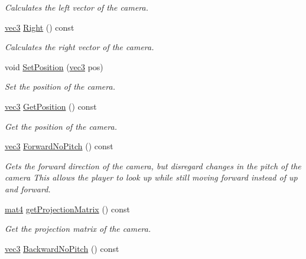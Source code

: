 \begin{DoxyCompactItemize}
\begin{DoxyCompactList}\small\item\em Calculates the left vector of the camera. \end{DoxyCompactList}\item 
\hyperlink{_types_8h_a3d0ce73e3199de81565fb01632415288}{vec3} \hyperlink{class_m_camera_a797ea9942318253479e27984da3ab285}{Right} () const 
\begin{DoxyCompactList}\small\item\em Calculates the right vector of the camera. \end{DoxyCompactList}\item 
void \hyperlink{class_m_camera_a17c2c4147555b6aaba51dec8d57e024b}{Set\+Position} (\hyperlink{_types_8h_a3d0ce73e3199de81565fb01632415288}{vec3} pos)
\begin{DoxyCompactList}\small\item\em Set the position of the camera. \end{DoxyCompactList}\item 
\hyperlink{_types_8h_a3d0ce73e3199de81565fb01632415288}{vec3} \hyperlink{class_m_camera_ac553d9ca4e16e421fe2ce9366c1f237e}{Get\+Position} () const 
\begin{DoxyCompactList}\small\item\em Get the position of the camera. \end{DoxyCompactList}\item 
\hyperlink{_types_8h_a3d0ce73e3199de81565fb01632415288}{vec3} \hyperlink{class_m_camera_a7c3c46db993bd13e119362483d93abc4}{Forward\+No\+Pitch} () const 
\begin{DoxyCompactList}\small\item\em Gets the forward direction of the camera, but disregard changes in the pitch of the camera This allows the player to look up while still moving forward instead of up and forward. \end{DoxyCompactList}\item 
\hyperlink{_types_8h_a2db59f395fe82a7394c6324956c265d8}{mat4} \hyperlink{class_m_camera_a29193c7d70b0922abceb288c1aefcb81}{get\+Projection\+Matrix} () const 
\begin{DoxyCompactList}\small\item\em Get the projection matrix of the camera. \end{DoxyCompactList}\item 
\hyperlink{_types_8h_a3d0ce73e3199de81565fb01632415288}{vec3} \hyperlink{class_m_camera_a5a65b30d471acdfa172adf0fb5ac163b}{Backward\+No\+Pitch} () const 

\end{DoxyCompactItemize}
